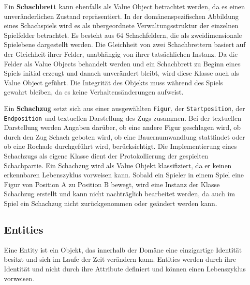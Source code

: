Ein \textbf{Schachbrett} kann ebenfalls als Value Object betrachtet werden, da es einen unveränderlichen Zustand repräsentiert. 
In der domänenspezifischen Abbildung eines Schachspiels wird es als übergeordnete Verwaltungsstruktur der einzelnen Spielfelder betrachtet. 
Es besteht aus 64 Schachfeldern, die als zweidimensionale Spielebene dargestellt werden.
Die Gleichheit von zwei Schachbrettern basiert auf der Gleichheit ihrer Felder, unabhängig von ihrer tatsächlichen Instanz. 
Da die Felder als Value Objects behandelt werden und ein Schachbrett zu Beginn eines Spiels initial erzeugt und danach unverändert bleibt, wird diese Klasse auch als Value Object geführt. 
Die Integrität des Objekts muss während des Spiels gewahrt bleiben, da es keine Verhaltensänderungen aufweist. 

Ein \textbf{Schachzug} setzt sich aus einer ausgewählten \texttt{Figur}, der \texttt{Startposition}, der \texttt{Endposition} und textuellen Darstellung des Zugs zusammen.
Bei der textuellen Darstellung werden Angaben darüber, ob eine andere Figur geschlagen wird, ob durch den Zug Schach geboten wird, ob eine Bauernumwandlung stattfindet oder ob eine Rochade durchgeführt wird, berücksichtigt. 
Die Implementierung eines Schachzugs als eigene Klasse dient der Protokollierung der gespielten Schachpartie. 
Ein Schachzug wird als Value Objekt klassifiziert, da er keinen erkennbaren Lebenszyklus vorweisen kann. 
Sobald ein Spieler in einem Spiel eine Figur von Position A zu Position B bewegt, wird eine Instanz der Klasse Schachzug erstellt und kann nicht nachträglich bearbeitet werden, da auch im Spiel ein Schachzug nicht zurückgenommen oder geändert werden kann. 

\subsection*{Entities}

Eine Entity ist ein Objekt, das innerhalb der Domäne eine einzigartige Identität besitzt und sich im Laufe der Zeit verändern kann. 
Entities werden durch ihre Identität und nicht durch ihre Attribute definiert und können einen Lebenszyklus vorweisen. 

